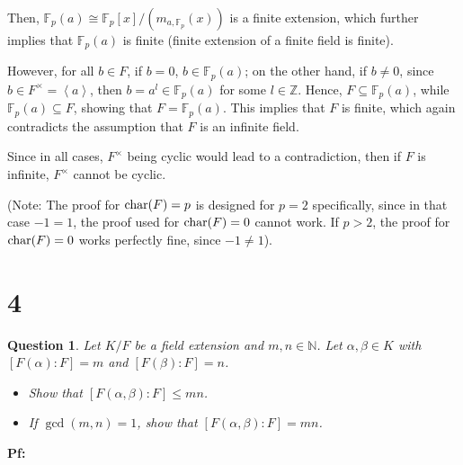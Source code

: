 \documentclass{article}
\newtheorem{question}{Question}
\begin{document}
Then, $\mathbb{F}_p(a) \cong \mathbb{F}_p[x]/(m_{a,\mathbb{F}_p}(x))$ is a finite extension, which further implies that $\mathbb{F}_p(a)$ is finite (finite extension of a finite field is finite).

However, for all $b\in F$, if $b=0$, $b\in\mathbb{F}_p(a)$; on the other hand, if $b\neq 0$, since $b\in F^\times = \left<a\right>$, then $b=a^l\in\mathbb{F}_p(a)$ for some $l\in\mathbb{Z}$. Hence, $F\subseteq\mathbb{F}_p(a)$, while $\mathbb{F}_p(a)\subseteq F$, showing that $F=\mathbb{F}_p(a)$. This implies that $F$ is finite, which again contradicts the assumption that $F$ is an infinite field.

\hfil

Since in all cases, $F^\times$ being cyclic would lead to a contradiction, then if $F$ is infinite, $F^\times$ cannot be cyclic.

(Note: The proof for $\textmd{char}(F)=p$ is designed for $p=2$ specifically, since in that case $-1=1$, the proof used for $\textmd{char}(F)=0$ cannot work. If $p>2$, the proof for $\textmd{char}(F)=0$ works perfectly fine, since $-1 \neq 1$).

\break

\section*{4}
\begin{myBox}[]{}
    \begin{question}
        Let $K/F$ be a field extension and $m,n\in\mathbb{N}$. Let $\alpha,\beta\in K$ with $[F(\alpha):F]=m$ and $[F(\beta):F]=n$.
        \begin{itemize}
            \item[(a)] Show that $[F(\alpha,\beta):F]\leq mn$.
            \item[(b)] If $\gcd(m,n)=1$, show that $[F(\alpha,\beta):F]=mn$.
        \end{itemize}
    \end{question}
\end{myBox}

\textbf{Pf:}
\end{document}
